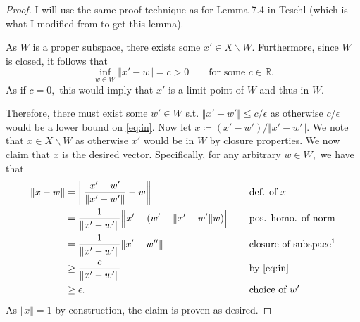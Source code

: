 \documentclass[10pt]{article}
\newtheorem{lemma}[]{Lemma}
\begin{document}
\begin{proof}
    I will use the same proof technique as for Lemma 7.4 in Teschl (which is what I modified from to get this lemma).
    
    As $W$ is a proper subspace, there exists some $x' \in X\backslash W.$ Furthermore, since $W$ is closed, it follows that
    \begin{equation}\label{eq:in}
        \inf_{w\in W} \Vert x' - w\Vert = c > 0 \qquad\text{for some }c\in\mathbb{R}.
    \end{equation}
    As if $c=0,$ this would imply that $x'$ is a limit point of $W$ and thus in $W.$

    Therefore, there must exist some $w' \in W$ s.t. $\Vert x'-w'\Vert \le c/\epsilon$ as otherwise $c/\epsilon$ would be a lower bound on \eqref{eq:in}. Now let $x \coloneqq (x'-w')/\Vert x'-w'\Vert.$ We note that $x \in X\backslash W$ as otherwise $x'$ would be in $W$ by closure properties. We now claim that $x$ is the desired vector. Specifically, for any arbitrary $w \in W,$ we have that
    \begin{alignat*}{2}
        \Vert x - w\Vert &= \left\Vert\frac{x'-w'}{\Vert x'-w' \Vert} - w\right\Vert &&\text{def. of $x$}\\
        &= \frac{1}{\Vert x'-w' \Vert}\Big\Vert x' - (w' - \Vert x'-w' \Vert w )\Big\Vert \quad&&\text{pos. homo. of norm}\\
        &= \frac{1}{\Vert x'-w' \Vert}\Vert x' - w'' \Vert &&\text{closure of subspace\footnotemark}\\
        &\ge \frac{c}{\Vert x'-w' \Vert} &&\text{by \eqref{eq:in}}\\
        &\ge \epsilon. &&\text{choice of $w'$}
    \end{alignat*}
    As $\Vert x\Vert = 1$ by construction, the claim is proven as desired.
\end{proof}


    
\end{document}

